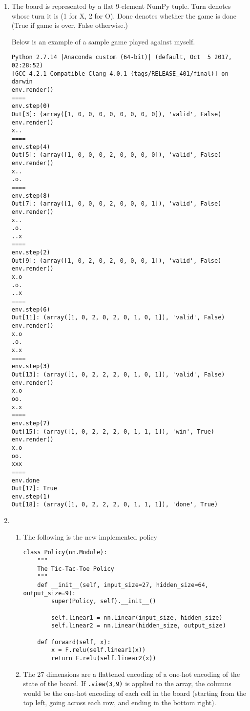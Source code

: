 \documentclass[10pt,letterpaper]{article}
\begin{document}
	\begin{enumerate}
		\item %
		The board is represented by a flat 9-element NumPy tuple. 
		Turn denotes whose turn it is (1 for X, 2 for O).
		Done denotes whether the game is done (True if game is over, False otherwise.)
		
		Below is an example of a sample game played against myself.
		\begin{verbatim}
Python 2.7.14 |Anaconda custom (64-bit)| (default, Oct  5 2017, 02:28:52) 
[GCC 4.2.1 Compatible Clang 4.0.1 (tags/RELEASE_401/final)] on darwin
env.render()
====
env.step(0)
Out[3]: (array([1, 0, 0, 0, 0, 0, 0, 0, 0]), 'valid', False)
env.render()
x..
====
env.step(4)
Out[5]: (array([1, 0, 0, 0, 2, 0, 0, 0, 0]), 'valid', False)
env.render()
x..
.o.
====
env.step(8)
Out[7]: (array([1, 0, 0, 0, 2, 0, 0, 0, 1]), 'valid', False)
env.render()
x..
.o.
..x
====
env.step(2)
Out[9]: (array([1, 0, 2, 0, 2, 0, 0, 0, 1]), 'valid', False)
env.render()
x.o
.o.
..x
====
env.step(6)
Out[11]: (array([1, 0, 2, 0, 2, 0, 1, 0, 1]), 'valid', False)
env.render()
x.o
.o.
x.x
====
env.step(3)
Out[13]: (array([1, 0, 2, 2, 2, 0, 1, 0, 1]), 'valid', False)
env.render()
x.o
oo.
x.x
====
env.step(7)
Out[15]: (array([1, 0, 2, 2, 2, 0, 1, 1, 1]), 'win', True)
env.render()
x.o
oo.
xxx
====
env.done
Out[17]: True
env.step(1)
Out[18]: (array([1, 0, 2, 2, 2, 0, 1, 1, 1]), 'done', True)
		\end{verbatim}
		\item %
		\begin{enumerate}
			\item %
			The following is the new implemented policy
\begin{lstlisting}
class Policy(nn.Module):
    """
    The Tic-Tac-Toe Policy
    """
    def __init__(self, input_size=27, hidden_size=64, output_size=9):
        super(Policy, self).__init__()

        self.linear1 = nn.Linear(input_size, hidden_size)
        self.linear2 = nn.Linear(hidden_size, output_size)

    def forward(self, x):
        x = F.relu(self.linear1(x))
        return F.relu(self.linear2(x))
\end{lstlisting}
			\item %
			The 27 dimensions are a flattened encoding of a one-hot encoding of the state of the board.
			If \verb|.view(3,9)| is applied to the array, the columns would be the one-hot encoding of each cell in the board (starting from the top left, going across each row, and ending in the bottom right).
			

\end{enumerate}
\end{enumerate}
\end{document}

